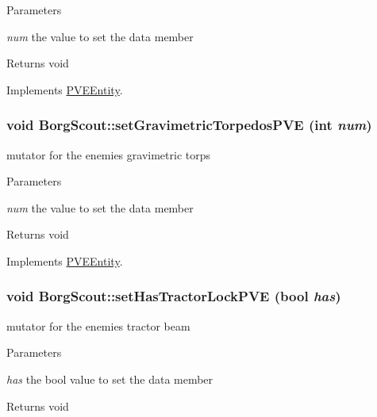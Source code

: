 \begin{DoxyParams}{Parameters}
\item[{\em num}]the value to set the data member\end{DoxyParams}
\begin{DoxyReturn}{Returns}
void 
\end{DoxyReturn}


Implements \hyperlink{classPVEEntity}{PVEEntity}.

\hypertarget{classBorgScout_aeb73af88f67173bff2f37138ef8b4b59}{
\subsubsection[{setGravimetricTorpedosPVE}]{\setlength{\rightskip}{0pt plus 5cm}void BorgScout::setGravimetricTorpedosPVE (int {\em num})}}
\label{d5/d8c/classBorgScout_aeb73af88f67173bff2f37138ef8b4b59}
mutator for the enemies gravimetric torps


\begin{DoxyParams}{Parameters}
\item[{\em num}]the value to set the data member\end{DoxyParams}
\begin{DoxyReturn}{Returns}
void 
\end{DoxyReturn}


Implements \hyperlink{classPVEEntity}{PVEEntity}.

\hypertarget{classBorgScout_a1d6f8704e2832ef1878d00a2cff6b288}{
\subsubsection[{setHasTractorLockPVE}]{\setlength{\rightskip}{0pt plus 5cm}void BorgScout::setHasTractorLockPVE (bool {\em has})}}
\label{d5/d8c/classBorgScout_a1d6f8704e2832ef1878d00a2cff6b288}
mutator for the enemies tractor beam


\begin{DoxyParams}{Parameters}
\item[{\em has}]the bool value to set the data member\end{DoxyParams}
\begin{DoxyReturn}{Returns}
void 
\end{DoxyReturn}


